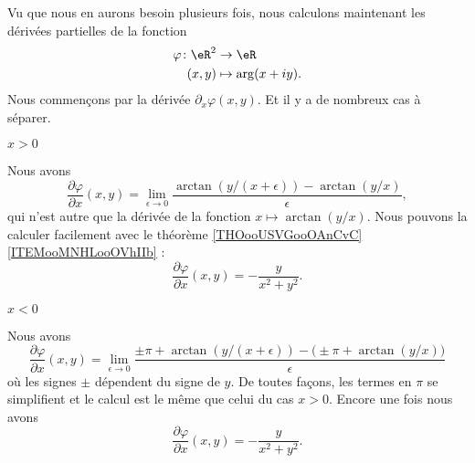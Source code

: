 \begin{normaltext}     \label{NORMooMRBEooVtTcIA}
    Vu que nous en aurons besoin plusieurs fois, nous calculons maintenant les dérivées partielles de la fonction
    \begin{equation}
        \begin{aligned}
            \varphi\colon \eR^2&\to \eR \\
            (x,y)&\mapsto \arg(x+iy). 
        \end{aligned}
    \end{equation}
    Nous commençons par la dérivée \( \partial_x\varphi(x,y)\). Et il y a de nombreux cas à séparer.
    \begin{subproof}

         \item[\( x>0\)]

             Nous avons
             \begin{equation}
                 \frac{ \partial \varphi }{ \partial x }(x,y)=\lim_{\epsilon\to 0}\frac{ \arctan(y/(x+\epsilon))-\arctan(y/x) }{ \epsilon },
             \end{equation}
             qui n'est autre que la dérivée de la fonction \( x\mapsto\arctan(y/x)\). Nous pouvons la calculer facilement avec le théorème \ref{THOooUSVGooOAnCvC}\ref{ITEMooMNHLooOVhIIb} :
             \begin{equation}
                 \frac{ \partial \varphi }{ \partial x }(x,y)=-\frac{ y }{ x^2+y^2 }.
             \end{equation}
             
         \item[\( x<0\)]

             Nous avons
             \begin{equation}
                 \frac{ \partial \varphi }{ \partial x }(x,y)=\lim_{\epsilon\to 0}\frac{ \pm\pi+\arctan(y/(x+\epsilon))-\big( \pm\pi+\arctan(y/x) \big) }{ \epsilon }
             \end{equation}
             où les signes \( \pm\) dépendent du signe de \( y\). De toutes façons, les termes en \( \pi\) se simplifient et le calcul est le même que celui du cas \( x>0\). Encore une fois nous avons
             \begin{equation}
                 \frac{ \partial \varphi }{ \partial x }(x,y)=-\frac{ y }{ x^2+y^2 }.
             \end{equation}


\end{subproof}
\end{normaltext}
